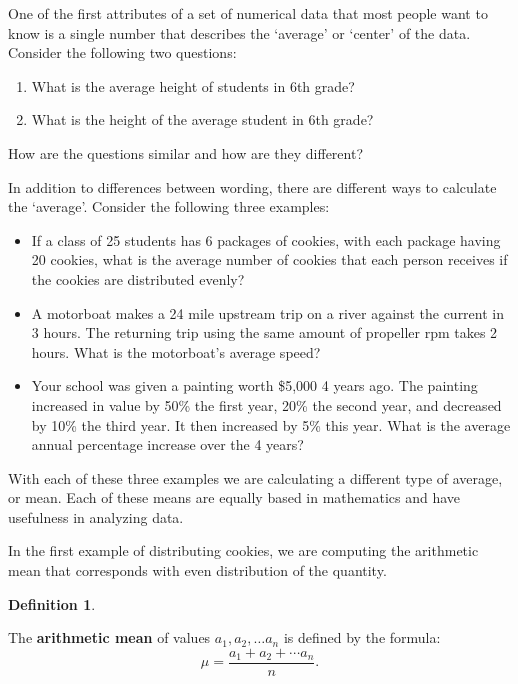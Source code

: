 \documentclass[
]{book}
\providecommand{\tightlist}{%
  \setlength{\itemsep}{0pt}\setlength{\parskip}{0pt}}
\theoremstyle{definition}
\newtheorem{definition}{Definition}[chapter]
\theoremstyle{definition}
\theoremstyle{definition}
\theoremstyle{definition}
\theoremstyle{remark}
\begin{document}
One of the first attributes of a set of numerical data that most people want to know is a single number that describes the `average' or `center' of the data. Consider the following two questions:

\begin{enumerate}
\def\labelenumi{\arabic{enumi}.}
\tightlist
\item
  What is the average height of students in 6th grade?
\item
  What is the height of the average student in 6th grade?
\end{enumerate}

How are the questions similar and how are they different?

In addition to differences between wording, there are different ways to calculate the `average'. Consider the following three examples:

\begin{itemize}
\item
  If a class of 25 students has 6 packages of cookies, with each package having 20 cookies, what is the average number of cookies that each person receives if the cookies are distributed evenly?
\item
  A motorboat makes a 24 mile upstream trip on a river against the current in 3 hours. The returning trip using the same amount of propeller rpm takes 2 hours. What is the motorboat's average speed?
\item
  Your school was given a painting worth \$5,000 4 years ago. The painting increased in value by 50\% the first year, 20\% the second year, and decreased by 10\% the third year. It then increased by 5\% this year. What is the average annual percentage increase over the 4 years?
\end{itemize}

With each of these three examples we are calculating a different type of average, or mean. Each of these means are equally based in mathematics and have usefulness in analyzing data.

In the first example of distributing cookies, we are computing the arithmetic mean that corresponds with even distribution of the quantity.

\begin{definition}
\protect\hypertarget{def:unlabeled-div-291}{}\label{def:unlabeled-div-291}

The \textbf{arithmetic mean} of values \(a_1, a_2, \ldots a_n\) is defined by the formula:
\[\mu = \frac{a_1 + a_2 + \cdots a_n}{n}.\]

\end{definition}
\end{document}
